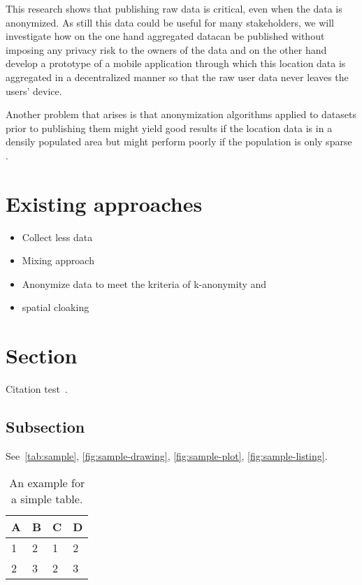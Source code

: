 This research shows that publishing raw data is critical, even when the data is anonymized.
As still this data could be useful for many stakeholders, we will investigate how on the one hand aggregated datacan be published without imposing any privacy risk to the owners of the data and on the other hand develop a prototype of a mobile application through which this location data is aggregated in a decentralized manner so that the raw user data never leaves the users' device.

Another problem that arises is that anonymization algorithms applied to datasets prior to publishing them might yield good results if the location data is in a densily populated area but might perform poorly if the population is only sparse \parencite{privacy-in-sparse-populated-locations}.

\section{Existing approaches}

\begin{itemize}
  \item Collect less data \parencite{privacy-home-work-pairs}
  \item Mixing approach \parencite{location-privacy}
  \item Anonymize data to meet the kriteria of k-anonymity \parencite{k-anonymity} and \parencite{cellphone}
  \item spatial cloaking \parencite{krumm}
\end{itemize}


\section{Section}
Citation test~\parencite{latex}.

\subsection{Subsection}

See~\autoref{tab:sample}, \autoref{fig:sample-drawing}, \autoref{fig:sample-plot}, \autoref{fig:sample-listing}.

\begin{table}[htpb]
  \caption[Example table]{An example for a simple table.}\label{tab:sample}
  \centering
  \begin{tabular}{l l l l}
    \toprule
      A & B & C & D \\
    \midrule
      1 & 2 & 1 & 2 \\
      2 & 3 & 2 & 3 \\
    \bottomrule
  \end{tabular}
\end{table}

